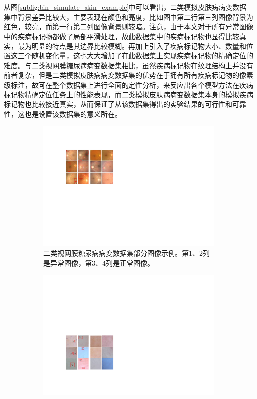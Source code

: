 从图\ref{subfig:bin_simulate_skin_example}中可以看出，二类模拟皮肤病病变数据集中背景差异比较大，主要表现在颜色和亮度，比如图中第二行第三列图像背景为红色，较亮，而第一行第二列图像背景则较暗。注意，由于本文对于所有异常图像中的疾病标记物都做了局部平滑处理，故此数据集中的疾病标记物也显得比较真实，最为明显的特点是其边界比较模糊。再加上引入了疾病标记物大小、数量和位置这三个随机变化量，这也大大增加了在此数据集上实现疾病标记物的精确定位的难度。与二类视网膜糖尿病病变数据集相比，虽然疾病标记物在纹理结构上并没有前者复杂，但是二类模拟皮肤病病变数据集的优势在于拥有所有疾病标记物的像素级标注，故可在整个数据集上进行全面的定性分析，来反应出各个模型方法在疾病标记物精确定位任务上的性能表现，而二类模拟皮肤病病变数据集本身的模拟疾病标记物也比较接近真实，从而保证了从该数据集得出的实验结果的可行性和可靠性，这也是设置该数据集的意义所在。
\begin{figure}[h]
	\centering
	\begin{subfigure}{0.48\textwidth}
		\centering
		\includegraphics[width=1\textwidth]{figure/bin_dr_ds_example}
		\caption{二类视网膜糖尿病病变数据集部分图像示例。第1、2列是异常图像，第3、4列是正常图像。}
		\label{subfig:bin_dr_ds_example}
	\end{subfigure}
	\quad
	\begin{subfigure}{0.48\textwidth}
		\centering
		\includegraphics[width=1\textwidth]{figure/bin_simulate_skin_example}

\end{subfigure}
\end{figure}
